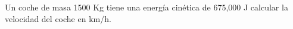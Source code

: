 \question[10] Un coche de masa 1500 Kg tiene una energía cinética de 675,000 J calcular la velocidad del coche en km/h.

\begin{solutionbox}{5cm}
    \begin{multicols}{2}

    \end{multicols}
\end{solutionbox}
